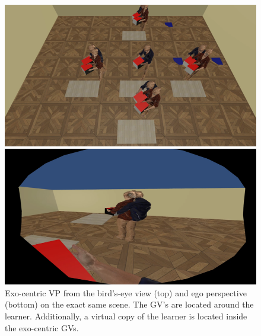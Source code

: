\begin{figure}[H]
	\centering
	\includegraphics[width=\textwidth]{figures/perspectiveEXO.png}
	\caption[Exo-centric visual perspective]{Exo-centric VP from the bird's-eye view (top) and ego perspective (bottom) on the exact same scene. The GV's are located around the learner. Additionally, a virtual copy of the learner is located inside the exo-centric GVs.}
	\label{fig:exo}
\end{figure}
